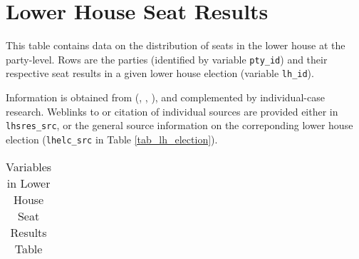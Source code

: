 \section{Lower House Seat Results}\label{sec_lower_house_seat_results}
This table contains data on the distribution of seats in the lower house at the party-level. 
Rows are the parties (identified by variable \texttt{\footnotesize pty\_id}) and their respective seat results in a given lower house election (variable \texttt{\footnotesize lh\_id}).

Information is obtained  from \citeauthor{Nohlen2001} (\citeyear{Nohlen2001}, \citeyear{Nohlen2005}, \citeyear{Nohlen2010}), and complemented by individual-case research. Weblinks to or citation of individual sources are provided either in \texttt{\footnotesize lhsres\_src}, or the general source information on the correponding lower house election (\texttt{\footnotesize lhelc\_src} in Table \ref{tab_lh_election}).


\begin{center}
\begin{longtable}{L{4cm} L{6cm} L{3cm}}
\caption{Variables in Lower House Seat Results Table\label{tab_lower_house_seat_results}}


\end{longtable}
\end{center}
